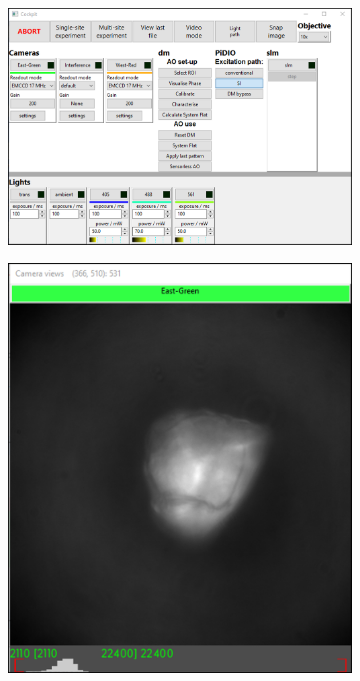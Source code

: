\begin{figure}[h]
	\centering
	\begin{subfigure}[t]{0.575\textwidth}
		\centering
		\includegraphics[width=\linewidth]{images/cockpit_GUI_main.png}
		\caption{}
		\label{fig:DeepSIM_control_software_main_window}
	\end{subfigure}
	\begin{subfigure}[t]{0.3325\textwidth}
		\centering
		\includegraphics[width=\linewidth]{images/cockpit_GUI_camera.png}
		\caption{}
		\label{fig:DeepSIM_control_software_camera}
	\end{subfigure}
	

\end{figure}

